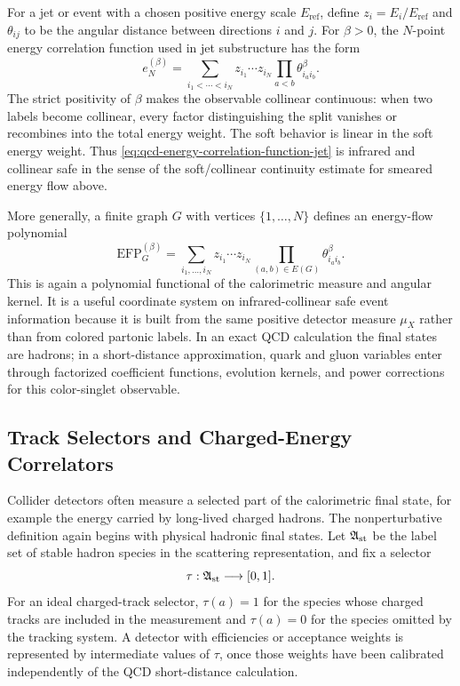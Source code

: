 For a jet or event with a chosen positive energy scale \(E_{\mathrm{ref}}\),
define \(z_i=E_i/E_{\mathrm{ref}}\) and
\(\theta_{ij}\) to be the angular distance between directions \(i\) and \(j\).
For \(\beta>0\), the \(N\)-point energy correlation function used in jet
substructure has the form
\begin{equation}
  e_N^{(\beta)}
  =
  \sum_{i_1<\cdots<i_N}
  z_{i_1}\cdots z_{i_N}
  \prod_{a<b}
  \theta_{i_a i_b}^{\beta}.
  \label{eq:qcd-energy-correlation-function-jet}
\end{equation}
The strict positivity of \(\beta\) makes the observable collinear continuous:
when two labels become collinear, every factor distinguishing the split
vanishes or recombines into the total energy weight.  The soft behavior is
linear in the soft energy weight.  Thus \eqref{eq:qcd-energy-correlation-function-jet}
is infrared and collinear safe in the sense of the soft/collinear continuity
estimate for smeared energy flow above.

More generally, a finite graph \(G\) with vertices
\(\{1,\ldots,N\}\) defines an energy-flow polynomial
\begin{equation}
  \mathrm{EFP}_G^{(\beta)}
  =
  \sum_{i_1,\ldots,i_N}
  z_{i_1}\cdots z_{i_N}
  \prod_{(a,b)\in E(G)}
  \theta_{i_a i_b}^{\beta}.
  \label{eq:qcd-energy-flow-polynomial}
\end{equation}
This is again a polynomial functional of the calorimetric measure and angular
kernel.  It is a useful coordinate system on infrared-collinear safe event
information because it is built from the same positive detector measure
\(\mu_X\) rather than from colored partonic labels.  In an exact QCD
calculation the final states are hadrons; in a short-distance approximation,
quark and gluon variables enter through factorized coefficient functions,
evolution kernels, and power corrections for this color-singlet observable.

\subsection{Track Selectors and Charged-Energy Correlators}
\label{subsec:qcd-track-energy-correlators}

Collider detectors often measure a selected part of the calorimetric final
state, for example the energy carried by long-lived charged hadrons.  The
nonperturbative definition again begins with physical hadronic final states.
Let \(\mathfrak A_{\rm st}\) be the label set of stable hadron species in the
scattering representation, and fix a selector
\[
  \tau:\mathfrak A_{\rm st}\longrightarrow[0,1].
\]
For an ideal charged-track selector, \(\tau(a)=1\) for the species whose
charged tracks are included in the measurement and \(\tau(a)=0\) for the
species omitted by the tracking system.  A detector with efficiencies or
acceptance weights is represented by intermediate values of \(\tau\), once
those weights have been calibrated independently of the QCD short-distance
calculation.

